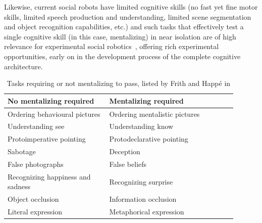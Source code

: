 Likewise, current social robots have limited cognitive skills (no fast yet fine
motor skills, limited speech production and understanding, limited scene
segmentation and object recognition capabilities, etc.) and such tasks that
effectively test a single cognitive skill (in this case, mentalizing) in near
isolation are of high relevance for experimental social
robotics~\parencite{lemaignan2015mutual}, offering rich experimental
opportunities, early on in the development process of the complete cognitive
architecture.

\begin{table}[h]
    \centering
    \begin{tabular}{p{0.4\linewidth}p{0.5\linewidth}}
        \toprule
        No mentalizing required           & Mentalizing required          \\
        \midrule
        Ordering behavioural pictures     & Ordering mentalistic pictures\parencite{baron1986mechanical} \\
        Understanding see                 & Understanding know\parencite{perner1989exploration}            \\
        Protoimperative pointing          & Protodeclarative pointing\parencite{baron1989perceptual}     \\
        Sabotage                          & Deception\parencite{sodian1992deception}                     \\
        False photographs                 & False beliefs\parencite{leslie1992domain}                 \\
        Recognizing happiness and sadness & Recognizing surprise\parencite{baron1993children}          \\
        Object occlusion                  & Information occlusion\parencite{baron1992out}         \\
        Literal expression                & Metaphorical expression\parencite{happe1993communicative}       \\
        \bottomrule
    \end{tabular}
    \caption{\small Tasks requiring or not mentalizing to pass, listed by Frith and Happé in\parencite{frith1994autism}}
    \label{mentalizing-tasks}
\end{table}


